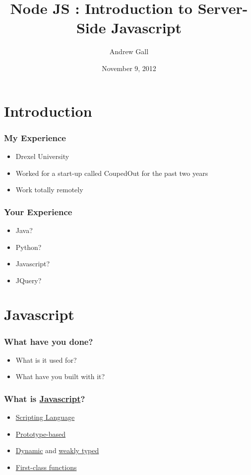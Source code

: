 \documentclass[ignorenonframetext,]{beamer}
\title{Node JS : Introduction to Server-Side Javascript}
\author{Andrew Gall}
\date{November 9, 2012}
\begin{document}
\frame{\titlepage}

\section{Introduction}

\begin{frame}\frametitle{My Experience}

\begin{itemize}
\item
  Drexel University
\item
  Worked for a start-up called CoupedOut for the past two years
\item
  Work totally remotely
\end{itemize}
\end{frame}

\begin{frame}\frametitle{Your Experience}

\begin{itemize}
\item
  Java?
\item
  Python?
\item
  Javascript?
\item
  JQuery?
\end{itemize}
\end{frame}

\section{Javascript}

\begin{frame}\frametitle{What have you done?}

\begin{itemize}[<+->]
\item
  What is it used for?
\item
  What have you built with it?
\end{itemize}
\end{frame}

\begin{frame}\frametitle{What is
\href{http://en.wikipedia.org/wiki/JavaScript}{Javascript}?}

\begin{itemize}[<+->]
\item
  \href{http://en.wikipedia.org/wiki/Scripting\_language}{Scripting
  Language}
\item
  \href{http://en.wikipedia.org/wiki/Prototype-based}{Prototype-based}
\item
  \href{http://en.wikipedia.org/wiki/Dynamic\_language}{Dynamic} and
  \href{http://en.wikipedia.org/wiki/Weak\_typing}{weakly typed}
\item
  \href{http://en.wikipedia.org/wiki/First-class\_functions}{First-class
  functions}
\end{itemize}
\end{frame}
\end{document}
